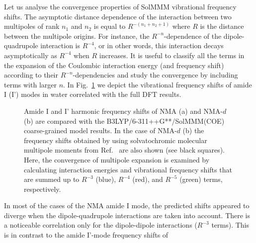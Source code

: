 \documentclass[b5paper,oneside,fleqn,11pt]{book}
\begin{document}
\begin{refsection}
Let us analyse the convergence properties of SolMMM vibrational
frequency shifts.
The asymptotic distance dependence of the interaction between
two multipoles of rank $n_1$ and $n_2$ is equal to $R^{-(n_1+n_2+1)}$
where $R$ is the distance between the multipole origins.
For instance, the $R^{-n}$\hyp{}dependence of the dipole\hyp{}quadrupole
interaction is $R^{-4}$, or in other words, this interaction decays asymptotically
as $R^{-4}$ when $R$ increases. It is useful to classify all the terms in the
expansion of the Coulombic interaction energy (and frequency shift)
according to their $R^{-n}$\hyp{}dependencies and study the convergence
by including terms with larger $n$. In Fig.~\ref{f:solmmm} we depict the
vibrational frequency shifts of amide I (I') modes in water
correlated with the full DFT results.
%
\begin{figure}[t!]
\centering
\setlength\fboxsep{0.4pt}
\setlength\fboxrule{0.5pt}
\caption{
Amide I and I' harmonic frequency shifts of NMA (a) and NMA-$d$ (b) 
are compared with the B3LYP/6-311++G**/SolMMM(COE) coarse\hyp{}grained
model results. In the case of NMA-$d$ (b) the frequency shifts obtained 
by using solvatochromic molecular multipole moments from Ref.~\citep{Lee.Choi.Cho.JCP.2012} 
are also shown (see black squares). Here, the convergence of multipole expansion 
is examined by calculating interaction energies and vibrational frequency shifts 
that are summed up to $R^{-3}$ (blue), $R^{-4}$ (red), and $R^{-5}$ (green) terms, 
respectively.
\label{f:solmmm}}
\end{figure}
%
In most of the cases of the NMA amide I mode, the predicted
shifts appeared to diverge when the dipole\hyp{}quadrupole
interactions are taken into account. 
There is a noticeable correlation only for the
dipole\hyp{}dipole interactions ($R^{-3}$ terms).
This is in contrast to the amide I'\hyp{}mode frequency shifts of

\end{refsection}
\end{document}
